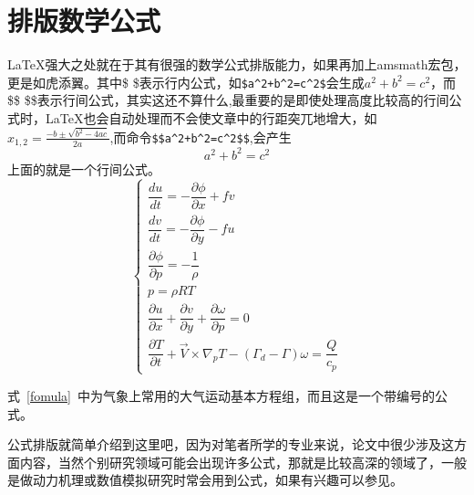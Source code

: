 \section{排版数学公式}
\LaTeX 强大之处就在于其有很强的数学公式排版能力，如果再加上amsmath宏包，更是如虎添翼。其中\$  \$表示行内公式，如\verb|$a^2+b^2=c^2$|会生成$a^2+b^2=c^2$，而\$\$  \$\$表示行间公式，其实这还不算什么,最重要的是即使处理高度比较高的行间公式时，\LaTeX 也会自动处理而不会使文章中的行距突兀地增大，如$x_{1,2}= \frac{-b\pm \sqrt{b^2-4ac}}{2a}$,而命令\verb|$$a^2+b^2=c^2$$|,会产生$$a^2+b^2=c^2$$
上面的就是一个行间公式。
\begin{equation}\label{fomula}
\begin{cases}


\dfrac{du}{dt}=-\dfrac{\partial \phi}{\partial x}+fv\\[1.5ex]
\dfrac{dv}{dt}=-\dfrac{\partial \phi}{\partial y}-fu\\[1.5ex]
\dfrac{\partial \phi}{\partial p}=-\dfrac{1}{\rho}\\[1.5ex]
p= \rho RT\\[1.5ex]

\dfrac{\partial u}{\partial x}+\dfrac{\partial v}{\partial y}+
\dfrac{\partial \omega}{\partial p}=0\\[1.5ex]
\dfrac{\partial T}{\partial t}+\overrightarrow{V}\times \nabla_pT-(\Gamma_d-\Gamma)\omega=\dfrac{Q}{c_p}
\end{cases}
\end{equation}

式~\ref{fomula}~中为气象上常用的大气运动基本方程组，而且这是一个带编号的公式。

公式排版就简单介绍到这里吧，因为对笔者所学的专业来说，论文中很少涉及这方面内容，当然个别研究领域可能会出现许多公式，那就是比较高深的领域了，一般是做动力机理或数值模拟研究时常会用到公式，如果有兴趣可以参见\cite{x1}。
